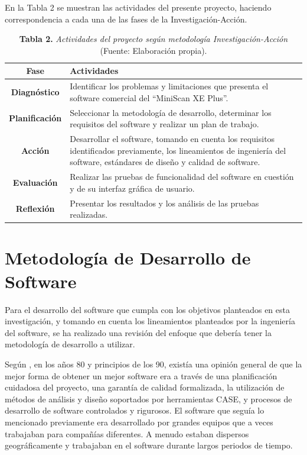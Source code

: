 En la Tabla 2 se muestran las actividades del presente proyecto, haciendo correspondencia a cada una de las fases de la Investigaci\'{o}n-Acci\'{o}n.
	\FloatBarrier %
	\begin{table}[htb]
		\small
		\centering
		\setlength{\extrarowheight}{5pt}
		\begin{tabulary}{15cm}{|c|L|}
			\hline
			\textbf{Fase} & \textbf{Actividades}\\ \hline
			\textbf{Diagn\'{o}stico} & Identificar los problemas y limitaciones que presenta el software comercial del ``MiniScan XE Plus''.\\ \hline
			\textbf{Planificaci\'{o}n} & Seleccionar la metodolog\'{i}a de desarrollo, determinar los requisitos del software y realizar un plan de trabajo.
\\ \hline
			\textbf{Acci\'{o}n} & Desarrollar el software, tomando en cuenta los requisitos identificados previamente, los lineamientos de ingenier\'{i}a del software, est\'{a}ndares de dise\~{n}o y calidad de software.\\ \hline
			\textbf{Evaluaci\'{o}n} & Realizar las pruebas de funcionalidad del software en cuesti\'{o}n y de su interfaz gr\'{a}fica de usuario.\\ \hline
			\textbf{Reflexi\'{o}n} & Presentar los resultados y los an\'{a}lisis de las pruebas realizadas.\\ \hline
	\end{tabulary}
		\caption{\textbf{Tabla 2.} \textit{Actividades del proyecto seg\'{u}n metodolog\'{i}a Investigaci\'{o}n-Acci\'{o}n }		(Fuente: Elaboración propia).}
	\end{table}
	\FloatBarrier %
	
	\section{Metodolog\'{i}a de Desarrollo de Software}
Para el desarrollo del software que cumpla con los objetivos planteados en esta investigaci\'{o}n, y tomando en cuenta los lineamientos planteados por la ingenier\'{i}a del software, se ha realizado una revisi\'{o}n del enfoque que deber\'{i}a tener la metodolog\'{i}a de desarrollo a utilizar.

Seg\'{u}n \cite{Sommerville}, en los a\~{n}os 80 y principios de los 90, exist\'{i}a una opini\'{o}n general de que la mejor forma de obtener un mejor software era a trav\'{e}s de una planificaci\'{o}n cuidadosa del proyecto, una garant\'{i}a de calidad formalizada, la utilizaci\'{o}n de m\'{e}todos de an\'{a}lisis y dise\~{n}o soportados por herramientas CASE, y procesos de desarrollo de software controlados y rigurosos. El software que segu\'{i}a lo mencionado previamente era desarrollado por grandes equipos que a veces trabajaban para compa\~{n}\'{i}as diferentes. A menudo estaban dispersos geogr\'{a}ficamente y trabajaban en el software durante largos periodos de tiempo.

